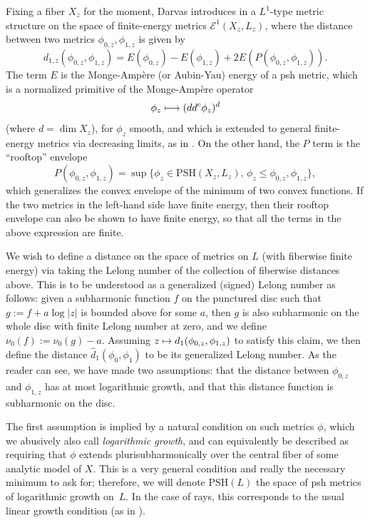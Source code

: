 \documentclass[JEP,XML,SOM,Unicode,NoEqCountersInSection,published]{cedram}
\def\mto{\mathchoice{\longmapsto}{\mapsto}{\mapsto}{\mapsto}}
\theoremstyle{definition}
\newcommand\cE{\mathcal{E}}
\newcommand\PSH{\mathrm{PSH}}
\begin{document}
Fixing a fiber $X_z$ for the moment, Darvas introduces in \cite{darv} a $L^1$-type metric structure on the space of finite-energy metrics $\cE^1(X_z,L_z)$, where the distance between two metrics $\phi_{0,z},\phi_{1,z}$ is given by
\[
d_{1,z}(\phi_{0,z},\phi_{1,z})=E(\phi_{0,z})-E(\phi_{1,z})+2E(P(\phi_{0,z},\phi_{1,z})).
\]
The term $E$ is the Monge-Ampère (or Aubin-Yau) energy of a psh metric, which is a normalized primitive of the Monge-Ampère operator
\[
\phi_z\mto (dd^c\phi_z)^d
\]
(where $d=\dim X_z$), for $\phi_z$ smooth, and which is extended to general finite-energy metrics via decreasing limits, as in \cite{bbgz}.
On the other hand, the $P$ term is the ``rooftop'' envelope
\[
P(\phi_{0,z},\phi_{1,z})=\sup\{\phi_z\in\PSH(X_z,L_z),\,\phi_z\leq\phi_{0,z},\phi_{1,z}\},
\]
which generalizes the convex envelope of the minimum of two convex functions. If the two metrics in the left-hand side have finite energy, then their rooftop envelope can also be shown to have finite energy, so that all the terms in the above expression are finite.

We wish to define a distance on the space of metrics on $L$ (with fiberwise finite energy) via taking the Lelong number of the collection of fiberwise distances above. This is to be understood as a generalized (signed) Lelong number as follows: given a subharmonic function $f$ on the punctured disc such that $g:=f+a\log|z|$ is bounded above for some $a$, then $g$ is also subharmonic on the whole disc with finite Lelong number at zero, and we define $\nu_0(f):=\nu_0(g)-a$.
Assuming $z\mto d_1(\phi_{0,z},\phi_{1,z})$ to satisfy this claim, we then define the distance $\hat d_1(\phi_0,\phi_1)$ to be its generalized Lelong number. As the reader can see, we have made two assumptions: that the distance between $\phi_{0,z}$ and $\phi_{1,z}$ has at most logarithmic growth, and that this distance function is subharmonic on the disc.

The first assumption is implied by a natural condition on such metrics $\phi$, which we abusively also call \textit{logarithmic growth}, and can equivalently be described as requiring that $\phi$ extends plurisubharmonically over the central fiber of some analytic model of $X$. This is a very general condition and really the necessary minimum to ask for; therefore, we will denote $\PSH(L)$ the space of psh metrics of logarithmic growth on~$L$. In the case of rays, this corresponds to the usual linear growth condition (as in \cite{bbj}).
\end{document}
